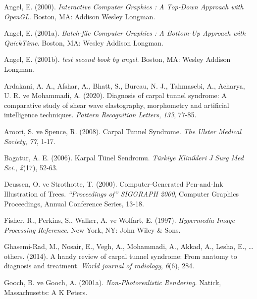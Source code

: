 \documentclass[12pt,twoside]{deuthesis}
\begin{document}
\hypertarget{refs}{}
\begin{CSLReferences}{1}{0}
\leavevmode{}%
Angel, E. (2000). \emph{Interactive Computer Graphics : A Top-Down Approach with OpenGL}. Boston, MA: Addison Wesley Longman.

\leavevmode{}%
Angel, E. (2001a). \emph{Batch-file Computer Graphics : A Bottom-Up Approach with QuickTime}. Boston, MA: Wesley Addison Longman.

\leavevmode{}%
Angel, E. (2001b). \emph{test second book by angel}. Boston, MA: Wesley Addison Longman.

\leavevmode{}%
Ardakani, A. A., Afshar, A., Bhatt, S., Bureau, N. J., Tahmasebi, A., Acharya, U. R. ve Mohammadi, A. (2020). Diagnosis of carpal tunnel syndrome: A comparative study of shear wave elastography, morphometry and artificial intelligence techniques. \emph{Pattern Recognition Letters}, \emph{133}, 77-85.

\leavevmode{}%
Aroori, S. ve Spence, R. (2008). Carpal Tunnel Syndrome. \emph{The Ulster Medical Society}, \emph{77}, 1-17.

\leavevmode{}%
Bagatur, A. E. (2006). Karpal Tünel Sendromu. \emph{Türkiye Klinikleri J Surg Med Sci.}, \emph{2}(17), 52-63.

\leavevmode{}%
Deussen, O. ve Strothotte, T. (2000). Computer-Generated Pen-and-Ink Illustration of Trees. \emph{{``Proceedings of''} SIGGRAPH 2000}, Computer Graphics Proceedings, Annual Conference Series, 13-18.

\leavevmode{}%
Fisher, R., Perkins, S., Walker, A. ve Wolfart, E. (1997). \emph{Hypermedia Image Processing Reference}. New York, NY: John Wiley \& Sons.

\leavevmode{}%
Ghasemi-Rad, M., Nosair, E., Vegh, A., Mohammadi, A., Akkad, A., Lesha, E., \ldots{} others. (2014). A handy review of carpal tunnel syndrome: From anatomy to diagnosis and treatment. \emph{World journal of radiology}, \emph{6}(6), 284.

\leavevmode{}%
Gooch, B. ve Gooch, A. (2001a). \emph{{Non-Photorealistic Rendering}}. Natick, Massachusetts: A K Peters.


\end{CSLReferences}
\end{document}
